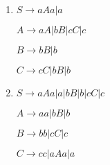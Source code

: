 \begin{question}

    \begin{enumerate}[label=\textbf{\alph*})]
        \item 

        $S \rightarrow aAa | a $
  
        $A \rightarrow aA | bB | cC | c $
    
        $B \rightarrow bB | b $ 

        $C \rightarrow cC | bB | b$

        \item

        $S \rightarrow aAa | a | bB | b | cC | c  $
  
        $A \rightarrow aa | bB | b $
    
        $B \rightarrow bb | cC | c $

        $C \rightarrow cc | aAa | a $ 

    \end{enumerate}

\end{question}
